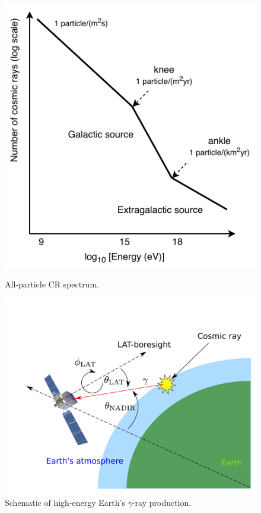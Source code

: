 \begin{figure}[h!]
    \begin{minipage}{0.45\textwidth}
        \includegraphics[width=\textwidth]{img/CRs_overview}
        \caption{All-particle CR spectrum.}
        \label{cr_knee_ankle}
    \end{minipage}\hspace{2pc}
    \begin{minipage}{0.55\textwidth}
        \includegraphics[width=\textwidth]{img/gamma_production_schematic}
        \caption{Schematic of high-energy Earth's $\gamma$-ray production.}
        \label{gamma_production_schematic}
    \end{minipage} 
\end{figure}

